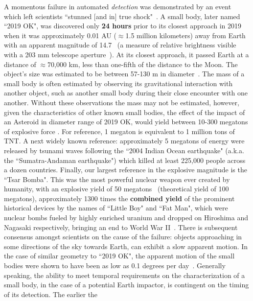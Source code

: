 A momentous failure in automated \textit{detection} was demonstrated by an
event which left scientists {``stunned [and in] true shock"}~\cite{chiu_2019}. A
small body, later named ``2019 OK",  was discovered only \textbf{24 hours} prior
to its closest approach in 2019 when it was approximately 0.01 AU ($\approx$1.5
million kilometers) away from Earth with an apparent magnitude of
14.7~\cite{IAU2019OK} (a measure of relative brightness visible with a 203 mm
telescope aperture~\cite[p.~24]{North2014}). At its closest approach, it passed
Earth at a distance of $\approx$70,000 km, less than one-fifth of the distance  %
to the Moon. The object's size was estimated to be between 57-130 m in
diameter~\cite{NASA2019}. The mass of a small body is often estimated by
observing its gravitational interaction with another object, such as another
small body during their close encounter with one another. Without these
observations the mass may not be estimated, however, given the characteristics
of other known small bodies, the effect of the impact of an Asteroid in diameter
range of 2019 OK, would yield between 10-300 megatons of explosive force
\cite{Cellino1999, Rumpf2017}. For reference, 1 megaton is equivalent to 1
million tons of TNT. A next widely known reference: approximately 5 megatons of
energy were released by tsunami waves following the ``2004 Indian Ocean
earthquake" (a.k.a. the ``Sumatra-Andaman earthquake") \cite{Nirupama2006} which
killed at least 225,000 people across a dozen countries. Finally, our largest
reference in the explosive magnitude is the ``Tsar Bomba". This was the
most powerful nuclear weapon ever created by humanity, with an explosive yield
of 50 megatons~\cite{Khan2020} (theoretical yield of 100 megatons),
approximately 1300 times the \textbf{combined yield} of the prominent historical
devices by the names of ``Little Boy" and ``Fat Man", which were nuclear bombs
fueled by highly enriched uranium and dropped on Hiroshima and Nagasaki
respectively, bringing an end to World War II~\cite{osti_1489669}. There is
subsequent consensus amongst scientists on the cause of the failure: objects
approaching in some directions of the sky towards Earth, can exhibit a slow
apparent motion. In the case of similar geometry to ``2019 OK", the apparent
motion of the small bodies were shown to have been as low as 0.1 degrees per
day~\cite{Wainscoat2022}. Generally speaking, the ability to meet temporal
requirements on the characterization of a small body, in the case of a potential
Earth impactor, is contingent on the timing of its detection. The earlier the
